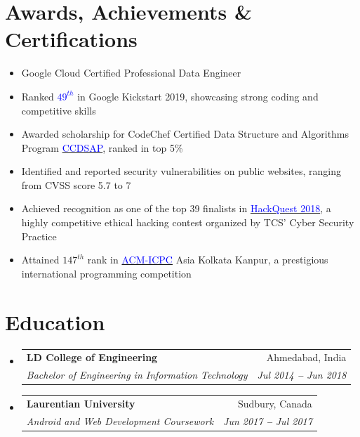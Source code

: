 \documentclass[letterpaper,11pt]{article}
\makeatletter
\newcommand{\resumeItem}[1]{
  \item\small{
    {#1 \vspace{-2pt}}
  }
}
\newcommand{\resumeSubheading}[4]{
  \vspace{-2pt}\item
    \begin{tabular*}{0.97\textwidth}[t]{l@{\extracolsep{\fill}}r}
      \textbf{#1} & #2 \\
      \textit{\small#3} & \textit{\small #4} \\
    \end{tabular*}\vspace{-7pt}
}
\newcommand{\resumeSubHeadingListStart}{\begin{itemize}[leftmargin=0.15in, label={}]}
\newcommand{\resumeSubHeadingListEnd}{\end{itemize}}
\newcommand{\resumeItemListStart}{\begin{itemize}}
\newcommand{\resumeItemListEnd}{\end{itemize}\vspace{-5pt}}
\makeatother
\begin{document}
\section{Awards, Achievements \& Certifications}
\vspace{2pt}
\resumeSubHeadingListStart
\small{\item{
              \resumeItemListStart
              \resumeItem{Google Cloud Certified Professional Data Engineer}
              \resumeItem{Ranked {\href{https://codingcompetitions.withgoogle.com/kickstart/round/0000000000050edd}{\textcolor{blue}{$49^{th}$}}}  in Google Kickstart 2019, showcasing strong coding and competitive skills}
              \resumeItem{Awarded scholarship for CodeChef Certified Data Structure and Algorithms Program {\href{https://www.codechef.com/certificates/public/d2ef739}{\textcolor{blue}{CCDSAP}}}, ranked in top 5\%}
              \resumeItem{Identified and reported security vulnerabilities on public websites, ranging from CVSS score 5.7 to 7}
              \resumeItem{Achieved recognition as one of the top 39 finalists in {\href{https://drive.google.com/file/d/1SxhoRm0vugUtpqTZGMbHX5BS0Gdx3D5k/view?usp=sharing}{\textcolor{blue}{HackQuest 2018}}}, a highly competitive ethical hacking contest organized by TCS' Cyber Security Practice}
              \resumeItem{Attained {$147^{th}$} rank in {\href{https://drive.google.com/file/d/19BKk_nhR-VvfI7R_30px68YTmWSB1CHY/view?usp=sharing}{\textcolor{blue}{ACM-ICPC}}} Asia Kolkata Kanpur, a prestigious international programming competition}
              \resumeItemListEnd
        }}
\resumeSubHeadingListEnd



\section{Education}
\vspace{3pt}
\resumeSubHeadingListStart
\resumeSubheading
{LD College of Engineering}{Ahmedabad, India}
{Bachelor of  Engineering in Information Technology}{Jul 2014 \textbf{--} Jun 2018}
\resumeSubheading
{Laurentian University}{Sudbury, Canada}
{Android and Web Development Coursework}{Jun 2017 \textbf{--} Jul 2017}
\resumeSubHeadingListEnd

\end{document}
